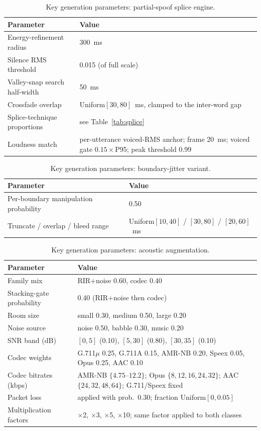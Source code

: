 \documentclass[11pt]{article}
\begin{document}
\begin{table}[H]
\centering
\caption{Key generation parameters: partial-spoof splice engine.}
\label{tab:params-splice}
\small
\begin{tabular}{p{4.9cm}p{7.2cm}}
\toprule
\textbf{Parameter} & \textbf{Value} \\
\midrule
Energy-refinement radius & \SI{300}{\milli\second} \\
Silence RMS threshold & 0.015 (of full scale) \\
Valley-snap search half-width & \SI{50}{\milli\second} \\
Crossfade overlap & Uniform$[30,80]$~ms, clamped to the inter-word gap \\
Splice-technique proportions & see Table~\ref{tab:splice} \\
Loudness match & per-utterance voiced-RMS anchor; frame \SI{20}{\milli\second}; voiced gate $0.15\times$P95; peak threshold 0.99 \\
\bottomrule
\end{tabular}
\end{table}

\begin{table}[H]
\centering
\caption{Key generation parameters: boundary-jitter variant.}
\label{tab:params-jitter}
\small
\begin{tabular}{p{4.9cm}p{7.2cm}}
\toprule
\textbf{Parameter} & \textbf{Value} \\
\midrule
Per-boundary manipulation probability & 0.50 \\
Truncate / overlap / bleed range & Uniform$[10,40]$ / $[30,80]$ / $[20,60]$~ms \\
\bottomrule
\end{tabular}
\end{table}

\begin{table}[H]
\centering
\caption{Key generation parameters: acoustic augmentation.}
\label{tab:params-augmentation}
\small
\begin{tabular}{p{4.9cm}p{7.2cm}}
\toprule
\textbf{Parameter} & \textbf{Value} \\
\midrule
Family mix & RIR+noise 0.60, codec 0.40 \\
Stacking-gate probability & 0.40 (RIR+noise then codec) \\
Room size & small 0.30, medium 0.50, large 0.20 \\
Noise source & noise 0.50, babble 0.30, music 0.20 \\
SNR band (dB) & $[0,5]$ (0.10), $[5,30]$ (0.80), $[30,35]$ (0.10) \\
Codec weights & G.711$\mu$ 0.25, G.711A 0.15, AMR-NB 0.20, Speex 0.05, Opus 0.25, AAC 0.10 \\
Codec bitrates (kbps) & AMR-NB $\{4.75\text{--}12.2\}$; Opus $\{8,12,16,24,32\}$; AAC $\{24,32,48,64\}$; G.711/Speex fixed \\
Packet loss & applied with prob.\ 0.30; fraction Uniform$[0,0.05]$ \\
Multiplication factors & $\times$2, $\times$3, $\times$5, $\times$10; same factor applied to both classes \\
\bottomrule
\end{tabular}
\end{table}
\end{document}
